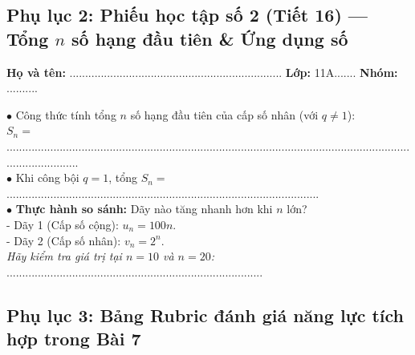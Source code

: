 \documentclass[12pt, a4paper]{article}
\begin{document}
\subsection*{Phụ lục 2: Phiếu học tập số 2 (Tiết 16) --- Tổng $n$ số hạng đầu tiên \& Ứng dụng số}
\noindent\textbf{Họ và tên:} .................................................................... \textbf{Lớp:} 11A....... \textbf{Nhóm:} ..........


\begin{pedabox}
    $\bullet$ Công thức tính tổng $n$ số hạng đầu tiên của cấp số nhân (với $q \neq 1$):\\
    $S_n = $ ........................................................................................................................................................\\[0.3em]
    $\bullet$ Khi công bội $q = 1$, tổng $S_n = $ ....................................................................................................\\[0.3em]
    $\bullet$ \textbf{Thực hành so sánh:} Dãy nào tăng nhanh hơn khi $n$ lớn?\\
    - Dãy 1 (Cấp số cộng): $u_n = 100n$.\\
    - Dãy 2 (Cấp số nhân): $v_n = 2^n$.\\
    \textit{Hãy kiểm tra giá trị tại $n = 10$ và $n = 20$:} ..................................................................................
\end{pedabox}


\subsection*{Phụ lục 3: Bảng Rubric đánh giá năng lực tích hợp trong Bài 7}
\end{document}
